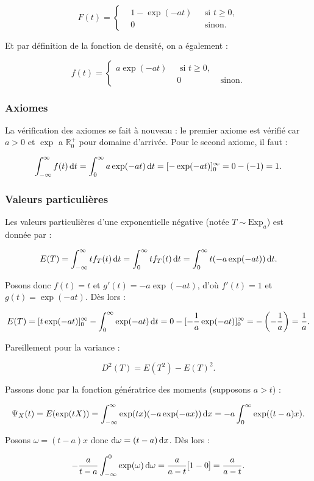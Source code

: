 \documentclass{article}
\begin{document}
		\[F(t) = \left\{\begin{aligned}
			&1-\exp(-at)\,\, &\text{ si $t \geq 0$}, \\
			& 0 &\text{ sinon}.
		\end{aligned}\right.\]

		Et par définition de la fonction de densité, on a également :

		\[f(t) = \left\{\begin{aligned}a\exp(-at)\,\,&\text{ si $t \geq 0$},\\&0 &\text{ sinon}.\end{aligned}\right.\]

		\subsubsection{Axiomes}
			La vérification des axiomes se fait à nouveau : le premier axiome est vérifié car $a > 0$ et $\exp$ a $\mathbb R_0^+$ pour domaine d'arrivée. Pour le second axiome,
			il faut :

			\[\int_{-\infty}^\infty f(t)\dif t = \int_0^\infty a\exp(-at)\dif t = [-\exp(-at)]_0^\infty = 0 - (-1) = 1.\]

		\subsubsection{Valeurs particulières}
			Les valeurs particulières d'une exponentielle négative (notée $T \sim \text{Exp}_a$) est donnée par :

			\[E(T) = \int_{-\infty}^\infty tf_T(t)\dif t = \int_0^\infty tf_T(t)\dif t = \int_0^\infty t(-a\exp(-at))\dif t.\]

			Posons donc $f(t) = t$ et $g'(t) = -a\exp(-at)$, d'où $f'(t) = 1$ et $g(t) = \exp(-at)$. Dès lors :

			\[E(T) = [t\exp(-at)]_0^\infty - \int_0^\infty \exp(-at)\dif t = 0 - [-\frac 1a\exp(-at)]_0^\infty = -\left(-\frac 1a\right) = \frac 1a.\]

			Pareillement pour la variance :

			\[D^2(T) = E(T^2)-E(T)^2.\]

			Passons donc par la fonction génératrice des moments (supposons $a > t$) :

			\[\Psi_X(t) = E(\exp(tX)) = \int_{-\infty}^\infty \exp(tx)(-a\exp(-ax))\dif x = -a\int_0^\infty \exp((t-a)x).\]

			Posons $\omega = (t-a)x$ donc $\dif\omega = (t-a)\dif x$. Dès lors :

			\[-\frac a{t-a}\int_{-\infty}^0\exp(\omega)\dif\omega = \frac a{a-t}[1-0] = \frac a{a-t}.\]
\end{document}
